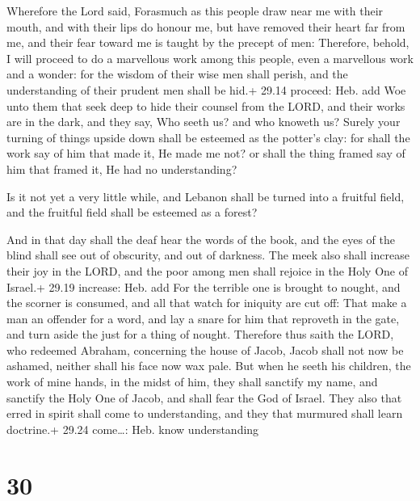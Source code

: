  Wherefore the Lord said, Forasmuch as this people draw
near me with their mouth, and with their lips do honour me, but have
removed their heart far from me, and their fear toward me is taught by
the precept of men:  Therefore, behold, I will proceed to
do a marvellous work among this people, even a marvellous work and a
wonder: for the wisdom of their wise men shall perish, and the
understanding of their prudent men shall be hid.+ 29.14 proceed: Heb.
add  Woe unto them that seek deep to hide their counsel
from the LORD, and their works are in the dark, and they say, Who seeth
us? and who knoweth us?  Surely your turning of things
upside down shall be esteemed as the potter's clay: for shall the work
say of him that made it, He made me not? or shall the thing framed say
of him that framed it, He had no understanding?

 Is it not yet a very little while, and Lebanon shall be
turned into a fruitful field, and the fruitful field shall be esteemed
as a forest?

 And in that day shall the deaf hear the words of the
book, and the eyes of the blind shall see out of obscurity, and out of
darkness.  The meek also shall increase their joy in the
LORD, and the poor among men shall rejoice in the Holy One of Israel.+
29.19 increase: Heb. add  For the terrible one is brought
to nought, and the scorner is consumed, and all that watch for iniquity
are cut off:  That make a man an offender for a word, and
lay a snare for him that reproveth in the gate, and turn aside the just
for a thing of nought.  Therefore thus saith the LORD, who
redeemed Abraham, concerning the house of Jacob, Jacob shall not now be
ashamed, neither shall his face now wax pale.  But when he
seeth his children, the work of mine hands, in the midst of him, they
shall sanctify my name, and sanctify the Holy One of Jacob, and shall
fear the God of Israel.  They also that erred in spirit
shall come to understanding, and they that murmured shall learn
doctrine.+ 29.24 come\ldots: Heb. know understanding

\hypertarget{section-29}{%
\section{30}\label{section-29}}

